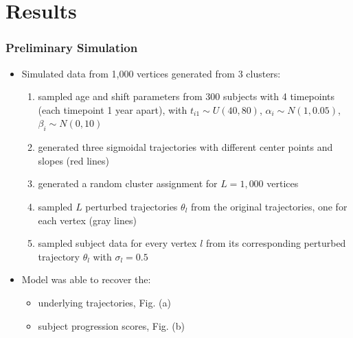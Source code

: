 \documentclass[8pt,xcolor=table]{beamer}
\begin{document}
\section{Results}
\begin{frame}
\frametitle{Preliminary Simulation}

\begin{itemize}
 \item Simulated data from 1,000 vertices generated from 3 clusters:
 \begin{enumerate}
  \item sampled age and shift parameters from 300 subjects with 4 timepoints (each timepoint 1 year apart), with $t_{i1} \sim U(40,80)$, $\alpha_i \sim N(1, 0.05)$, $\beta_i \sim N(0, 10)$ 
  \item generated three sigmoidal trajectories with different center points and slopes (red lines) 
  \item generated a random cluster assignment for $L = 1,000$ vertices 
  \item sampled $L$ perturbed trajectories $\theta_l$ from the original trajectories, one for each vertex (gray lines) 
  \item sampled subject data for every vertex $l$ from its corresponding perturbed trajectory $\theta_l$ with $\sigma_l = 0.5$
 \end{enumerate}
 \item Model was able to recover the:
 \begin{itemize}
  \item underlying trajectories, Fig. (a)
  \item subject progression scores, Fig. (b)
 \end{itemize}

 
\end{itemize}


\end{frame}
\end{document}
